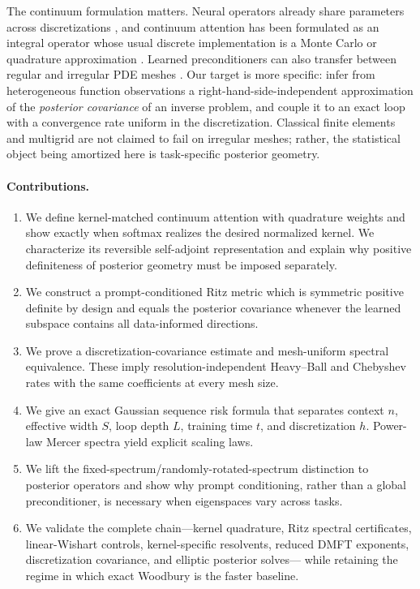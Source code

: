 \documentclass[11pt,a4paper]{article}
\numberwithin{equation}{section}
\theoremstyle{definition}
\theoremstyle{remark}
\begin{document}
The continuum formulation matters.  Neural operators already share
parameters across discretizations \citep{kovachki2023neuraloperator}, and
continuum attention has been formulated as an integral operator whose usual
discrete implementation is a Monte Carlo or quadrature approximation
\citep{calvello2025continuum}.  Learned preconditioners can also transfer
between regular and irregular PDE meshes \citep{li2025npo}.  Our target is
more specific: infer from heterogeneous function observations a
right-hand-side-independent approximation of the \emph{posterior covariance}
of an inverse problem, and couple it to an exact loop with a convergence rate
uniform in the discretization.  Classical finite elements and multigrid are
not claimed to fail on irregular meshes; rather, the statistical object being
amortized here is task-specific posterior geometry.

\paragraph{Contributions.}
\begin{enumerate}[leftmargin=*,itemsep=2pt]
 \item We define kernel-matched continuum attention with quadrature weights
 and show exactly when softmax realizes the desired normalized kernel.  We
 characterize its reversible self-adjoint representation and explain why
 positive definiteness of posterior geometry must be imposed separately.
 \item We construct a prompt-conditioned Ritz metric which is symmetric
 positive definite by design and equals the posterior covariance whenever the
 learned subspace contains all data-informed directions.
 \item We prove a discretization-covariance estimate and mesh-uniform spectral
 equivalence.  These imply resolution-independent Heavy--Ball and Chebyshev
 rates with the same coefficients at every mesh size.
 \item We give an exact Gaussian sequence risk formula that separates context
 $n$, effective width $S$, loop depth $L$, training time $t$, and
 discretization $h$.  Power-law Mercer spectra yield explicit scaling laws.
 \item We lift the fixed-spectrum/randomly-rotated-spectrum distinction to
 posterior operators and show why prompt conditioning, rather than a global
 preconditioner, is necessary when eigenspaces vary across tasks.
 \item We validate the complete chain---kernel quadrature, Ritz spectral
 certificates, linear-Wishart controls, kernel-specific resolvents, reduced
 DMFT exponents, discretization covariance, and elliptic posterior solves---
 while retaining the regime in which exact Woodbury is the faster baseline.
\end{enumerate}
\end{document}
